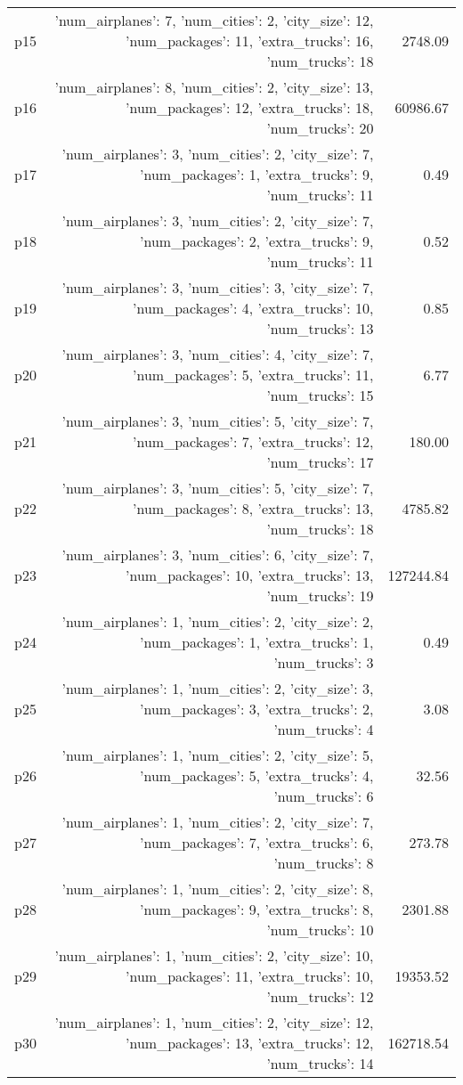 \documentclass{article}
\begin{document}
\begin{center}
\begin{tabular}{@{}l|r|r@{}}
  p15&{'num\_airplanes': 7, 'num\_cities': 2, 'city\_size': 12, 'num\_packages': 11, 'extra\_trucks': 16, 'num\_trucks': 18}&2748.09\\
  p16&{'num\_airplanes': 8, 'num\_cities': 2, 'city\_size': 13, 'num\_packages': 12, 'extra\_trucks': 18, 'num\_trucks': 20}&60986.67\\
  p17&{'num\_airplanes': 3, 'num\_cities': 2, 'city\_size': 7, 'num\_packages': 1, 'extra\_trucks': 9, 'num\_trucks': 11}&0.49\\
  p18&{'num\_airplanes': 3, 'num\_cities': 2, 'city\_size': 7, 'num\_packages': 2, 'extra\_trucks': 9, 'num\_trucks': 11}&0.52\\
  p19&{'num\_airplanes': 3, 'num\_cities': 3, 'city\_size': 7, 'num\_packages': 4, 'extra\_trucks': 10, 'num\_trucks': 13}&0.85\\
  p20&{'num\_airplanes': 3, 'num\_cities': 4, 'city\_size': 7, 'num\_packages': 5, 'extra\_trucks': 11, 'num\_trucks': 15}&6.77\\
  p21&{'num\_airplanes': 3, 'num\_cities': 5, 'city\_size': 7, 'num\_packages': 7, 'extra\_trucks': 12, 'num\_trucks': 17}&180.00\\
  p22&{'num\_airplanes': 3, 'num\_cities': 5, 'city\_size': 7, 'num\_packages': 8, 'extra\_trucks': 13, 'num\_trucks': 18}&4785.82\\
  p23&{'num\_airplanes': 3, 'num\_cities': 6, 'city\_size': 7, 'num\_packages': 10, 'extra\_trucks': 13, 'num\_trucks': 19}&127244.84\\
  p24&{'num\_airplanes': 1, 'num\_cities': 2, 'city\_size': 2, 'num\_packages': 1, 'extra\_trucks': 1, 'num\_trucks': 3}&0.49\\
  p25&{'num\_airplanes': 1, 'num\_cities': 2, 'city\_size': 3, 'num\_packages': 3, 'extra\_trucks': 2, 'num\_trucks': 4}&3.08\\
  p26&{'num\_airplanes': 1, 'num\_cities': 2, 'city\_size': 5, 'num\_packages': 5, 'extra\_trucks': 4, 'num\_trucks': 6}&32.56\\
  p27&{'num\_airplanes': 1, 'num\_cities': 2, 'city\_size': 7, 'num\_packages': 7, 'extra\_trucks': 6, 'num\_trucks': 8}&273.78\\
  p28&{'num\_airplanes': 1, 'num\_cities': 2, 'city\_size': 8, 'num\_packages': 9, 'extra\_trucks': 8, 'num\_trucks': 10}&2301.88\\
  p29&{'num\_airplanes': 1, 'num\_cities': 2, 'city\_size': 10, 'num\_packages': 11, 'extra\_trucks': 10, 'num\_trucks': 12}&19353.52\\
  p30&{'num\_airplanes': 1, 'num\_cities': 2, 'city\_size': 12, 'num\_packages': 13, 'extra\_trucks': 12, 'num\_trucks': 14}&162718.54
                            \end{tabular}
                            \end{center}
                    
\end{document}

